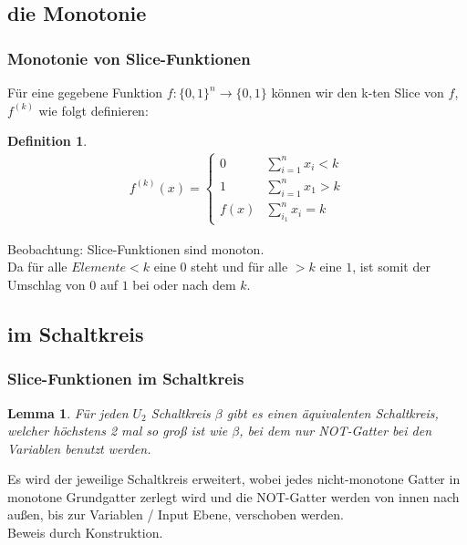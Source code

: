 \documentclass[hyperref={pdfpagelabels=false}]{beamer} %
\newtheorem{defin}{Definition}
\newtheorem{lem}{Lemma}
\begin{document}
\subsection*{die Monotonie}
\begin{frame}
 \frametitle{Monotonie von Slice-Funktionen}
Für eine gegebene Funktion $f:\{0,1\}^n \rightarrow \{0,1\}$ können wir den k-ten Slice von $f$,
$f^{(k)}$ wie folgt definieren:\\
\begin{defin}
\begin{align*}
	f^{(k)}(x) = \begin{cases}
		0 & \sum\nolimits_{i=1}^{n} x_i < k\\
		1 & \sum\nolimits_{i=1}^{n} x_1 > k\\
		f(x) &\sum\nolimits_{i_1}^{n} x_i = k
	\end{cases}
\end{align*}
\end{defin}
Beobachtung: Slice-Funktionen sind monoton.\\
Da für alle $Elemente < k$ eine $0$ steht und für alle $> k$ eine $1$, ist somit der Umschlag von $0$ auf $1$ bei oder nach dem $k$.
\end{frame}

\subsection{im Schaltkreis}
\begin{frame}%
 \frametitle{Slice-Funktionen im Schaltkreis}
\begin{lem}
	Für jeden $U_2$ Schaltkreis $\beta$ gibt es einen äquivalenten Schaltkreis, welcher höchstens
	2 mal so groß ist wie $\beta$, bei dem nur NOT-Gatter bei den Variablen benutzt werden. %
\end{lem}
Es wird der jeweilige Schaltkreis erweitert, wobei jedes nicht-monotone Gatter in monotone Grundgatter zerlegt wird und die NOT-Gatter werden von innen nach außen, bis zur Variablen / Input Ebene, verschoben werden.
\\Beweis durch Konstruktion.
\end{frame}
\end{document}
